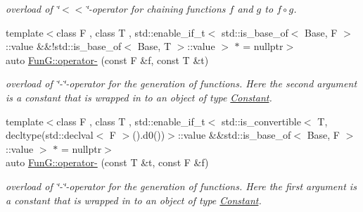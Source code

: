 \begin{DoxyCompactItemize}
\begin{DoxyCompactList}\small\item\em overload of \char`\"{}$<$$<$\char`\"{}-\/operator for chaining functions $f$ and $g$ to $ f \circ g $. \end{DoxyCompactList}\item 
{\footnotesize template$<$class F , class T , std\+::enable\+\_\+if\+\_\+t$<$ std\+::is\+\_\+base\+\_\+of$<$ Base, F $>$\+::value \&\&!std\+::is\+\_\+base\+\_\+of$<$ Base, T $>$\+::value $>$ $\ast$  = nullptr$>$ }\\auto \hyperlink{namespaceFunG_aa0c4552dee9179fb50b57ece863d835a}{Fun\+G\+::operator-\/} (const F \&f, const T \&t)
\begin{DoxyCompactList}\small\item\em overload of \char`\"{}-\/\char`\"{}-\/operator for the generation of functions. Here the second argument is a constant that is wrapped in to an object of type \hyperlink{structFunG_1_1Constant}{Constant}. \end{DoxyCompactList}\item 
{\footnotesize template$<$class F , class T , std\+::enable\+\_\+if\+\_\+t$<$ std\+::is\+\_\+convertible$<$ T, decltype(std\+::declval$<$ F $>$().\+d0())$>$\+::value \&\&std\+::is\+\_\+base\+\_\+of$<$ Base, F $>$\+::value $>$ $\ast$  = nullptr$>$ }\\auto \hyperlink{namespaceFunG_a7f522d98a8d5bc8c3b11599d3136ded4}{Fun\+G\+::operator-\/} (const T \&t, const F \&f)
\begin{DoxyCompactList}\small\item\em overload of \char`\"{}-\/\char`\"{}-\/operator for the generation of functions. Here the first argument is a constant that is wrapped in to an object of type \hyperlink{structFunG_1_1Constant}{Constant}. \end{DoxyCompactList}\end{DoxyCompactItemize}
